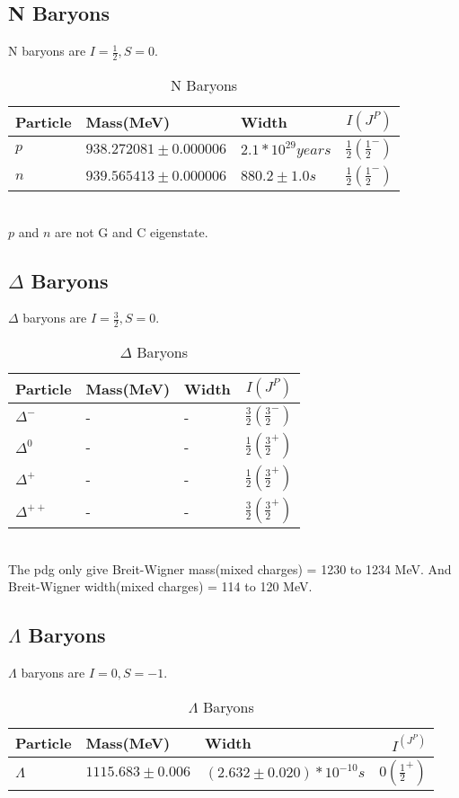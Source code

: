 \documentclass[
10pt, %
a4paper, %
oneside, %
headinclude,footinclude, %
BCOR5mm, %
]{scrartcl}
\begin{document}
\subsection{N Baryons}
N baryons are $I=\frac{1}{2}, S=0$.
\begin{table}[hbt]
\caption{N Baryons}
\centering
\begin{tabular}{lllr}
\toprule
Particle & Mass(MeV) & Width & $I(J^{P})$ \\
\midrule
$p$ & $938.272081\pm0.000006$ & $2.1*10^{29}years$ &  $\frac{1}{2}(\frac{1}{2}^-)$\\
$n$ & $939.565413\pm0.000006$ &$880.2\pm1.0s$ & $\frac{1}{2}(\frac{1}{2}^-)$ \\
\bottomrule
\end{tabular}
\label{tab:label}
\end{table}\\
$p$ and $n$ are not G and C eigenstate. 

\subsection{$\Delta$ Baryons}
$\Delta$ baryons are $I=\frac{3}{2}, S=0$.
\begin{table}[hbt]
\caption{$\Delta$ Baryons}
\centering
\begin{tabular}{lllr}
\toprule
Particle & Mass(MeV) & Width & $I(J^{P})$ \\
\midrule
$\Delta^-$      &     -     &      -      &     $\frac{3}{2}(\frac{3}{2}^-)$\\
$\Delta^0$     &     -     &      -      &     $\frac{1}{2}(\frac{3}{2}^+)$\\
$\Delta^+$     &     -     &      -      &     $\frac{1}{2}(\frac{3}{2}^+)$\\
$\Delta^{++}$      &     -       &      -      &     $\frac{3}{2}(\frac{3}{2}^+)$\\
\bottomrule
\end{tabular}
\label{tab:label}
\end{table}\\
The pdg only give Breit-Wigner mass(mixed charges) = 1230 to 1234 MeV. And Breit-Wigner width(mixed charges) = 114 to 120 MeV.



\subsection{$\Lambda$ Baryons}
$\Lambda$ baryons are $I=0, S=-1$.
\begin{table}[hbt]
\caption{$\Lambda$ Baryons}
\centering
\begin{tabular}{lllr}
\toprule
Particle & Mass(MeV) & Width & $I^(J^{P})$ \\
\midrule
$\Lambda$      &     $1115.683\pm0.006$     &      $(2.632\pm0.020)*10^{-10}s$      &     $0(\frac{1}{2}^+)$\\
\bottomrule
\end{tabular}
\label{tab:label}
\end{table}\\
\end{document}
